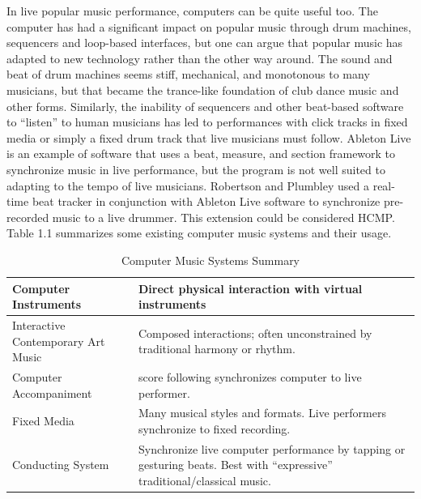 In live popular music performance, computers can be quite useful too.
The computer has had a significant
impact on popular music through drum machines, sequencers and loop-based
interfaces, but one can argue that popular music has adapted to new technology
rather than the other way around. The sound and beat of drum machines seems stiff,
mechanical, and monotonous to many musicians, but that became the trance-like
foundation of club dance music and other forms. Similarly, 
the inability of
sequencers and other beat-based software to “listen” to human musicians has led to
performances with click tracks in fixed media or simply a fixed drum track that live
musicians must follow. Ableton Live \cite{Ableton:2011} is an example of software that
uses a beat, measure, and section framework to synchronize music in live
performance, but the program is not well suited to adapting to the tempo of live
musicians. Robertson and Plumbley \cite{Robertson:2007} used a real-time beat 
tracker in
conjunction with Ableton Live software to synchronize pre-recorded music 
to a live drummer. This extension could be considered HCMP.
Table 1.1 summarizes some existing computer music systems and their usage.

\begin{table}[htdp]
\centering
\begin{tabular}{| p{5cm} | p{8cm} |}

\hline
Computer Instruments & Direct physical interaction with virtual instruments \\

\hline 
Interactive Contemporary Art Music & Composed interactions; often unconstrained by
traditional harmony or rhythm.\\

\hline
Computer Accompaniment & score following synchronizes computer to live performer.\\

\hline
Fixed Media  & Many musical styles and formats. Live performers
synchronize to fixed recording.\\

\hline
Conducting System & Synchronize live computer performance by tapping or
gesturing beats. Best with “expressive”
traditional/classical music.\\
\hline
\end{tabular}
\caption[Computer Music Systems Summary]{Computer Music Systems Summary}
\label{latexin_genes} %
\end{table}

